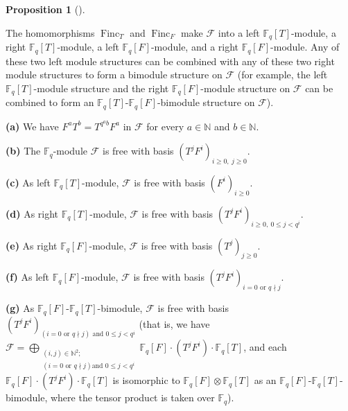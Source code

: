 \documentclass[numbers=enddot,12pt,final,onecolumn,notitlepage]{scrartcl}%
\theoremstyle{definition}
\newtheorem{prop}[theo]{Proposition}
\newenvironment{proposition}[1][]
{\begin{prop}[#1]\begin{leftbar}}
{\end{leftbar}\end{prop}}
\begin{document}
\begin{proposition}
\label{prop.F.bases}The homomorphisms $\operatorname*{Finc}\nolimits_{T}$ and
$\operatorname*{Finc}\nolimits_{F}$ make $\mathcal{F}$ into a left
$\mathbb{F}_{q}\left[  T\right]  $-module, a right $\mathbb{F}_{q}\left[
T\right]  $-module, a left $\mathbb{F}_{q}\left[  F\right]  $-module, and a
right $\mathbb{F}_{q}\left[  F\right]  $-module. Any of these two left module
structures can be combined with any of these two right module structures to
form a bimodule structure on $\mathcal{F}$ (for example, the left
$\mathbb{F}_{q}\left[  T\right]  $-module structure and the right
$\mathbb{F}_{q}\left[  F\right]  $-module structure on $\mathcal{F}$ can be
combined to form an $\mathbb{F}_{q}\left[  T\right]  $-$\mathbb{F}_{q}\left[
F\right]  $-bimodule structure on $\mathcal{F}$).

\textbf{(a)} We have $F^{a}T^{b}=T^{q^{a}b}F^{a}$ in $\mathcal{F}$ for every
$a\in\mathbb{N}$ and $b\in\mathbb{N}$.

\textbf{(b)} The $\mathbb{F}_{q}$-module $\mathcal{F}$ is free with basis
$\left(  T^{j}F^{i}\right)  _{i\geq0,\ j\geq0}$.

\textbf{(c)} As left $\mathbb{F}_{q}\left[  T\right]  $-module, $\mathcal{F}$
is free with basis $\left(  F^{i}\right)  _{i\geq0}$.

\textbf{(d)} As right $\mathbb{F}_{q}\left[  T\right]  $-module, $\mathcal{F}$
is free with basis $\left(  T^{j}F^{i}\right)  _{i\geq0,\ 0\leq j<q^{i}}$.

\textbf{(e)} As right $\mathbb{F}_{q}\left[  F\right]  $-module, $\mathcal{F}$
is free with basis $\left(  T^{j}\right)  _{j\geq0}$.

\textbf{(f)} As left $\mathbb{F}_{q}\left[  F\right]  $-module, $\mathcal{F}$
is free with basis $\left(  T^{j}F^{i}\right)  _{i=0\text{ or }q\nmid j}$.

\textbf{(g)} As $\mathbb{F}_{q}\left[  F\right]  $-$\mathbb{F}_{q}\left[
T\right]  $-bimodule, $\mathcal{F}$ is free with basis $\left(  T^{j}%
F^{i}\right)  _{\left(  i=0\text{ or }q\nmid j\right)  \text{ and }0\leq
j<q^{i}}$ (that is, we have $\mathcal{F}=\bigoplus\limits_{\substack{\left(
i,j\right)  \in\mathbb{N}^{2};\\\left(  i=0\text{ or }q\nmid j\right)  \text{
and }0\leq j<q^{i}}}\mathbb{F}_{q}\left[  F\right]  \cdot\left(  T^{j}%
F^{i}\right)  \cdot\mathbb{F}_{q}\left[  T\right]  $, and each $\mathbb{F}%
_{q}\left[  F\right]  \cdot\left(  T^{j}F^{i}\right)  \cdot\mathbb{F}%
_{q}\left[  T\right]  $ is isomorphic to $\mathbb{F}_{q}\left[  F\right]
\otimes\mathbb{F}_{q}\left[  T\right]  $ as an $\mathbb{F}_{q}\left[
F\right]  $-$\mathbb{F}_{q}\left[  T\right]  $-bimodule, where the tensor
product is taken over $\mathbb{F}_{q}$).
\end{proposition}
\end{document}
